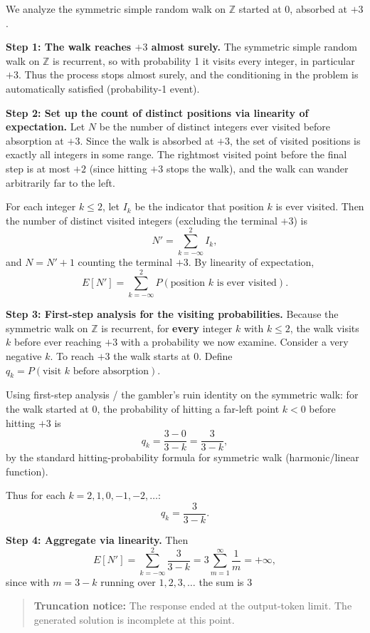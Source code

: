 \documentclass[
  11pt,
  letterpaper,
]{article}
\begin{document}
We analyze the symmetric simple random walk on \(\mathbb{Z}\) started at
0, absorbed at \(+3\).

\textbf{Step 1: The walk reaches \(+3\) almost surely.} The symmetric
simple random walk on \(\mathbb{Z}\) is recurrent, so with probability 1
it visits every integer, in particular \(+3\). Thus the process stops
almost surely, and the conditioning in the problem is automatically
satisfied (probability-1 event).

\textbf{Step 2: Set up the count of distinct positions via linearity of
expectation.} Let \(N\) be the number of distinct integers ever visited
before absorption at \(+3\). Since the walk is absorbed at \(+3\), the
set of visited positions is exactly all integers in some range. The
rightmost visited point before the final step is at most \(+2\) (since
hitting \(+3\) stops the walk), and the walk can wander arbitrarily far
to the left.

For each integer \(k \le 2\), let \(I_k\) be the indicator that position
\(k\) is ever visited. Then the number of distinct visited integers
(excluding the terminal \(+3\)) is \[N' = \sum_{k=-\infty}^{2} I_k,\]
and \(N = N' + 1\) counting the terminal \(+3\). By linearity of
expectation,
\[E[N'] = \sum_{k=-\infty}^{2} P(\text{position } k \text{ is ever visited}).\]

\textbf{Step 3: First-step analysis for the visiting probabilities.}
Because the symmetric walk on \(\mathbb{Z}\) is recurrent, for
\textbf{every} integer \(k\) with \(k \le 2\), the walk visits \(k\)
before ever reaching \(+3\) with a probability we now examine. Consider
a very negative \(k\). To reach \(+3\) the walk starts at \(0\). Define
\(q_k = P(\text{visit } k \text{ before absorption})\).

Using first-step analysis / the gambler's ruin identity on the symmetric
walk: for the walk started at \(0\), the probability of hitting a
far-left point \(k<0\) before hitting \(+3\) is
\[q_k = \frac{3 - 0}{3 - k} = \frac{3}{3-k},\] by the standard
hitting-probability formula for symmetric walk (harmonic/linear
function).

Thus for each \(k = 2, 1, 0, -1, -2, \dots\): \[q_k = \frac{3}{3-k}.\]

\textbf{Step 4: Aggregate via linearity.} Then
\[E[N'] = \sum_{k=-\infty}^{2} \frac{3}{3-k} = 3\sum_{m=1}^{\infty} \frac{1}{m} = +\infty,\]
since with \(m = 3-k\) running over \(1,2,3,\dots\) the sum is \(3\)

\begin{quote}
\textbf{Truncation notice:} The response ended at the output-token
limit. The generated solution is incomplete at this point.
\end{quote}
\end{document}
